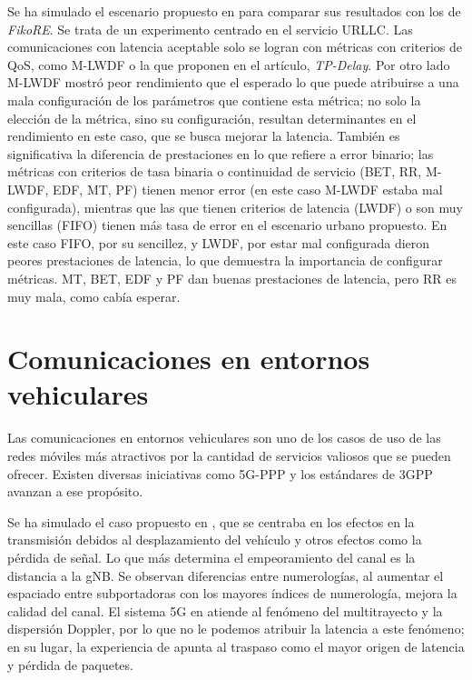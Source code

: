 \documentclass[12pt]{report} %
\begin{document}
Se ha simulado el escenario propuesto en \cite{RefWorks:66} para comparar sus resultados con los de \textit{FikoRE}.
Se trata de un experimento centrado en el servicio URLLC.
Las comunicaciones con latencia aceptable solo se logran con métricas con criterios de QoS, como M-LWDF o la que proponen en el artículo, \textit{TP-Delay}.
Por otro lado M-LWDF mostró peor rendimiento que el esperado lo que puede atribuirse a una mala configuración de los parámetros que contiene esta métrica;
no solo la elección de la métrica, sino su configuración, resultan determinantes en el rendimiento en este caso, que se busca mejorar la latencia.
También es significativa la diferencia de prestaciones en lo que refiere a error binario;
las métricas con criterios de tasa binaria o continuidad de servicio (BET, RR, M-LWDF, EDF, MT, PF) tienen menor error (en este caso M-LWDF estaba mal configurada),
mientras que las que tienen criterios de latencia (LWDF) o son muy sencillas (FIFO) tienen más tasa de error en el escenario urbano propuesto.
En este caso FIFO, por su sencillez, y LWDF, por estar mal configurada dieron peores prestaciones de latencia, lo que demuestra la importancia de configurar métricas.
MT, BET, EDF y PF dan buenas prestaciones de latencia, pero RR es muy mala, como cabía esperar.

\section{Comunicaciones en entornos vehiculares}

Las comunicaciones en entornos vehiculares son uno de los casos de uso de las redes móviles más atractivos por la cantidad de servicios valiosos que se pueden ofrecer.
Existen diversas iniciativas como 5G-PPP y los estándares de 3GPP avanzan a ese propósito.

Se ha simulado el caso propuesto en \cite{RefWorks:25}, que se centraba en los efectos en la transmisión debidos al desplazamiento del vehículo y otros efectos como la pérdida de señal.
Lo que más determina el empeoramiento del canal es la distancia a la gNB.
Se observan diferencias entre numerologías, al aumentar el espaciado entre subportadoras
con los mayores índices de numerología, mejora la calidad del canal.
El sistema 5G en atiende al fenómeno del multitrayecto y la dispersión Doppler, por lo que no le podemos atribuir la latencia a este fenómeno;
en su lugar, la experiencia de \cite{RefWorks:25} apunta al traspaso como el mayor origen de latencia y pérdida de paquetes.
\end{document}
